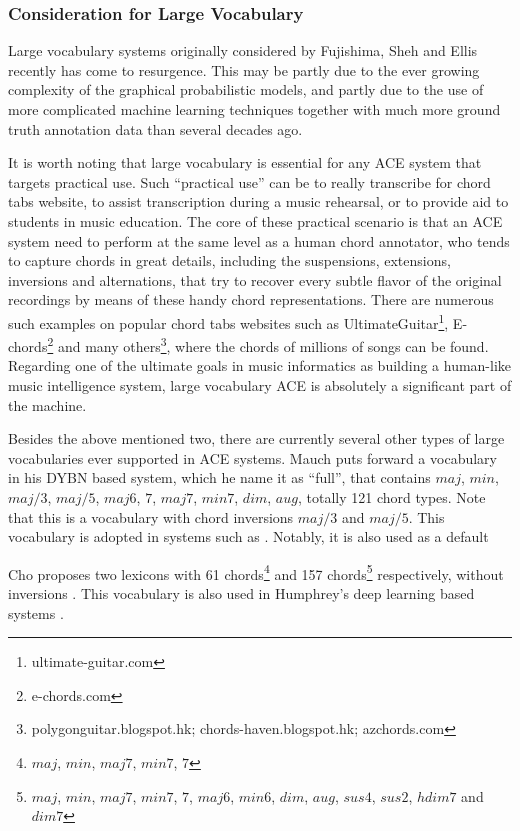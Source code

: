 \subsubsection{Consideration for Large Vocabulary} \label{sec:2-largevocab}
Large vocabulary systems originally considered by Fujishima, Sheh and Ellis \cite{fujishima1999realtime,sheh2003chord} recently has come to resurgence. This may be partly due to the ever growing complexity of the graphical probabilistic models, and partly due to the use of more complicated machine learning techniques together with much more ground truth annotation data than several decades ago.

It is worth noting that large vocabulary is essential for any ACE system that targets practical use. Such ``practical use'' can be to really transcribe for chord tabs website, to assist transcription during a music rehearsal, or to provide aid to students in music education. The core of these practical scenario is that an ACE system need to perform at the same level as a human chord annotator, who tends to capture chords in great details, including the suspensions, extensions, inversions and alternations, that try to recover every subtle flavor of the original recordings by means of these handy chord representations. There are numerous such examples on popular chord tabs websites such as UltimateGuitar\footnote{ultimate-guitar.com}, E-chords\footnote{e-chords.com} and many others\footnote{polygonguitar.blogspot.hk; chords-haven.blogspot.hk; azchords.com}, where the chords of millions of songs can be found. Regarding one of the ultimate goals in music informatics as building a human-like music intelligence system, large vocabulary ACE is absolutely a significant part of the machine.

Besides the above mentioned two, there are currently several other types of large vocabularies ever supported in ACE systems. Mauch \cite{mauch2010automatic} puts forward a vocabulary in his DYBN based system, which he name it as ``full'', that contains $maj$, $min$, $maj/3$, $maj/5$, $maj6$, $7$, $maj7$, $min7$, $dim$, $aug$, totally 121 chord types. Note that this is a vocabulary with chord inversions $maj/3$ and $maj/5$. This vocabulary is adopted in systems such as \cite{ni2012end,mcvicar2014automatic,boulanger2013audio}. Notably, it is also used as a default

Cho \cite{cho2014improved} proposes two lexicons with 61 chords\footnote{$maj$, $min$, $maj7$, $min7$, $7$} and 157 chords\footnote{$maj$, $min$, $maj7$, $min7$, $7$, $maj6$, $min6$, $dim$, $aug$, $sus4$, $sus2$, $hdim7$ and $dim7$} respectively, without inversions \cite{burgoyne2014comparative}. This vocabulary is also used in Humphrey's deep learning based systems \cite{humphreyfour,humphrey2015exploration}.

